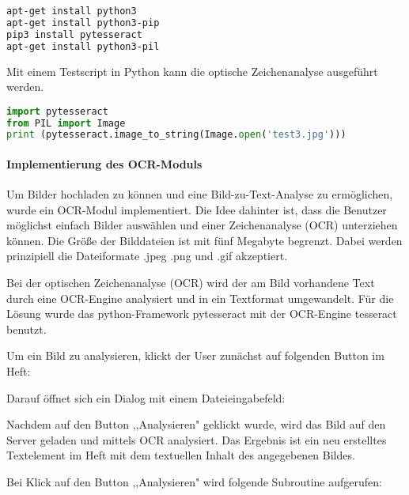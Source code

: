 \begin{lstlisting}[caption={pytesseract-Installation}, language=bash]
apt-get install python3
apt-get install python3-pip
pip3 install pytesseract
apt-get install python3-pil
\end{lstlisting}

Mit einem Testscript in Python kann die optische Zeichenanalyse ausgeführt werden.

\begin{lstlisting}[caption={pytesseract-Code}, language=Python]
import pytesseract
from PIL import Image
print (pytesseract.image_to_string(Image.open('test3.jpg')))
\end{lstlisting}

\paragraph{Implementierung des OCR-Moduls}
Um Bilder hochladen zu können und eine Bild-zu-Text-Analyse zu ermöglichen, wurde ein OCR-Modul implementiert. Die Idee dahinter ist, dass die Benutzer möglichst einfach Bilder auswählen und einer Zeichenanalyse (OCR) unterziehen können. Die Größe der Bilddateien ist mit fünf Megabyte begrenzt. Dabei werden prinzipiell die Dateiformate .jpeg .png und .gif akzeptiert.

Bei der optischen Zeichenanalyse (OCR) wird der am Bild vorhandene Text durch eine OCR-Engine analysiert und in ein Textformat umgewandelt. Für die Lösung wurde das python-Framework pytesseract mit der OCR-Engine tesseract benutzt.

Um ein Bild zu analysieren, klickt der User zunächst auf folgenden Button im Heft:


Darauf öffnet sich ein Dialog mit einem Dateieingabefeld:


Nachdem auf den Button ,,Analysieren" geklickt wurde, wird das Bild auf den Server geladen und mittels OCR analysiert. Das Ergebnis ist ein neu erstelltes Textelement im Heft mit dem textuellen Inhalt des angegebenen Bildes.

Bei Klick auf den Button ,,Analysieren" wird folgende Subroutine aufgerufen:

